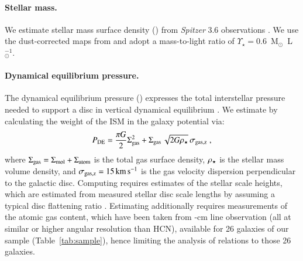 \documentclass[letter, longauth]{aa} %
\begin{document}
\paragraph{Stellar mass.}
We estimate stellar mass surface density (\sigstar) from \textit{Spitzer} \SI{3.6}{\micron} observations \citep{Sheth2010,Querejeta2021b}. We use the dust-corrected maps from \citet{Querejeta2015} and adopt a mass-to-light ratio of $\Upsilon_\star = 0.6$~M$_\odot$~L$_\odot^{-1}$.

\paragraph{Dynamical equilibrium pressure.}
The dynamical equilibrium pressure (\pde) expresses the total interstellar pressure needed to support a disc in vertical dynamical equilibrium \citep[e.g., see][]{Ostriker2022, Schinnerer2024}. We estimate \pde by calculating the weight of the ISM in the galaxy potential via:
\begin{align}
    P_{\text{DE}} = \dfrac{\pi G}{2}\Sigma_{\text{gas}}^2 + \Sigma_{\text{gas}} \, \sqrt{2G\rho_{\star}} \, \sigma_{\rm gas, z} \;,
\end{align}
where $\Sigma_{\text{gas}}=\Sigma_{\text{mol}} + \Sigma_{\text{atom}}$ is the total gas surface density, $\rho_{\star}$ is the stellar mass volume density, and $\sigma_{\rm gas, z}=\SI{15}{\km\per\s}$ \citep[e.g.][]{Sun2018} is the gas velocity dispersion perpendicular to the galactic disc.
Computing \rhostar requires estimates of the stellar scale heights, which are estimated from measured stellar disc scale lengths by assuming a typical disc flattening ratio \citep[see][for more details]{Sun2020b,Sun2022}.
Estimating \pde additionally requires measurements of the atomic gas content, which have been taken from -cm line observation (all at similar or higher angular resolution than HCN), available for 26 galaxies of our sample (Table~\ref{tab:sample}), hence limiting the analysis of \pde relations to those 26 galaxies.
\end{document}
